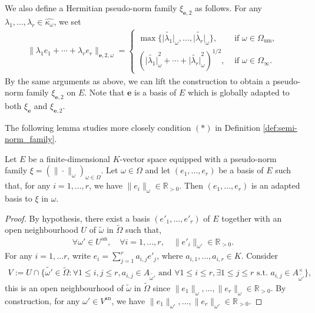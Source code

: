 \documentclass [11pt,reqno]{amsart}
\def\bR{{\mathbb{R}}}
\newcommand{\1}{\mathmybb{1}}
\def\an{\operatorname{an}}
\def\um{\operatorname{um}}
\def\tilde{\widetilde}
\begin{document}
\begin{example}
\begin{itemize}
We also define a Hermitian pseudo-norm family $\xi_{\mathbf{e},2}$ as follows. For any $\lambda_1,...,\lambda_r \in \widehat{\kappa_{\omega}}$, we set
\begin{align*}
\|\lambda_{1} e_{1}+\cdots+\lambda_{r}e_{r}\|_{\mathbf{e},2,\omega}=\left\{\begin{matrix}
\max\{\tilde{|\lambda_{1}|}_\omega,...,\tilde{|\lambda_{r}|}_\omega\}, &\text{ if } \omega \in \Omega_{\um},\\ 
(\tilde{|\lambda_{1}|}_\omega^2+\cdots + \tilde{|\lambda_{r}|}_\omega^2)^{1/2}, &\text{ if } \omega \in \Omega_{\infty}. 
\end{matrix}\right.
\end{align*}
By the same arguments as above, we can lift the construction to obtain a pseudo-norm family $\xi_{\mathbf{e},2}$ on $E$. Note that $\mathbf{e}$ is a basis of $E$ which is globally adapted to both $\xi_{\mathbf{e}}$ and $\xi_{\mathbf{e},2}$.
\end{itemize}
\end{example}

The following lemma studies more closely condition $(\ast)$ in Definition \ref{def:semi-norm_family}.

\begin{lemma}
\label{lemma:pseudo-norm_family_base_change}
Let $E$ be a finite-dimensional $K$-vector space equipped with a pseudo-norm family $\xi=(\|\cdot\|_{\omega})_{\omega\in\Omega}$. Let $\omega\in\Omega$ and let $(e_1,...,e_r)$ be a basis of $E$ such that, for any $i=1,...,r$, we have $\|e_i\|_{\omega}\in \bR_{>0}$. Then $(e_1,...,e_r)$ is an adapted basis to $\xi$ in $\omega$.
\end{lemma}

\begin{proof}
By hypothesis, there exist a basis $(e'_1,...,e'_r)$ of $E$ together with an open neighbourhood $U$ of $\tilde{\omega}$ in $\tilde{\Omega}$ such that,
\begin{align*}
\forall \omega'\in U^{\an},\quad \forall i=1,...,r,\quad \|e'_i\|_{\omega'} \in \bR_{>0}. 
\end{align*} 
For any $i=1,...r$, write $e_{i}=\sum_{j=1}^{r}a_{i,j}e'_{j}$, where $a_{i,1},...,a_{i,r}\in K$. Consider
\begin{align*}
V:= U \cap \{\tilde{\omega'}\in\tilde{\Omega}: \forall 1\leq i,j\leq r, a_{i,j}\in A_{\tilde{\omega'}} \text{ and } \forall 1\leq i\leq r, \exists 1\leq j\leq r \text{ s.t. }a_{i,j}\in A_{\tilde{\omega'}}^{\times}\},
\end{align*}
this is an open neighbourhood of $\tilde{\omega}$ in $\tilde{\Omega}$ since $\|e_{1}\|_{\omega},...,\|e_{r}\|_{\omega}\in\bR_{>0}$. By construction, for any $\omega'\in V^{\an}$, we have $\|e_{1}\|_{\omega'},...,\|e_{r}\|_{\omega'}\in\bR_{>0}$.
\end{proof}
\end{document}

